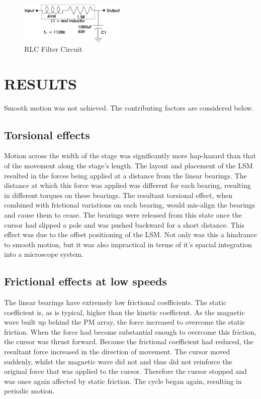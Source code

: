 \documentclass[10pt,twocolumn]{witseiepaper}
\begin{document}
\begin{figure}[hb]
	\centering
		\includegraphics[width=0.45\textwidth]{../../Drawings/Filter.pdf}
	\caption{RLC Filter Circuit}
	\label{fig:Filter}
\end{figure}
\section{RESULTS}

Smooth motion was not achieved.  The contributing factors are considered below.

\subsection{Torsional effects}

Motion across the width of the stage was significantly more hap-hazard than
that of the movement along the stage's length.  The layout and placement of
the LSM resulted in the forces being applied at a distance from the linear
bearings.  The distance at which this force was applied was different for each
bearing, resulting in different torques on these bearings.  The resultant
torsional effect, when combined with frictional variations on each bearing,
would mis-align the bearings and cause them to cease.  The bearings were
released from this state once the cursor had slipped a pole and was pushed
backward for a short distance.  This effect was due to the offset positioning
of the LSM.  Not only was this a hindrance to smooth motion, but it was also
impractical in terms of it's spacial integration into a microscope system.

\subsection{Frictional effects at low speeds}

The linear bearings have extremely low frictional coefficients.  The static
coefficient is, as is typical, higher than the kinetic coefficient.  As the
magnetic wave built up behind the PM array, the force increased to overcome
the static friction.  When the force had become substantial enough to overcome
this friction, the cursor was thrust forward.  Because the frictional
coefficient had reduced, the resultant force increased in the direction of
movement.  The cursor moved suddenly, whilst the magnetic wave did not and
thus did not reinforce the original force that was applied to the cursor.
Therefore the cursor stopped and was once again affected by static friction.
The cycle began again, resulting in periodic motion.
\end{document}
